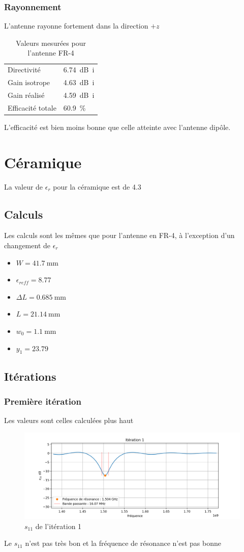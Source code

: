 \documentclass[Deriaz_Traiber_Labo02.tex]{subfiles}
\begin{document}
\subsubsection{Rayonnement}
L'antenne rayonne fortement dans la direction $+z$
\begin{table}[H]
\centering
\begin{tabular}{ll}
Directivité & \SI{6.74}{\deci\bel i}\\
Gain isotrope & \SI{4.63}{\deci\bel i}\\
Gain réalisé & \SI{4.59}{\deci\bel i}\\
Efficacité totale & \SI{60.9}{\percent}
\end{tabular}
\caption{Valeurs mesurées pour l'antenne FR-4}
\end{table}
L'efficacité est bien moins bonne que celle atteinte avec l'antenne dipôle.
\section{Céramique}
La valeur de $\epsilon_r$ pour la céramique est de 4.3
\subsection{Calculs}
Les calculs sont les mêmes que pour l'antenne en FR-4, à l'exception d'un changement de $\epsilon_r$
\begin{itemize}
\item $W=\SI{41.7}{\milli\meter}$
\item $\epsilon_{reff}=8.77$
\item $\Delta L=\SI{0.685}{\milli\meter}$
\item $L=\SI{21.14}{\milli\meter}$
\item $w_0=\SI{1.1}{\milli\meter}$
\item $y_1=23.79$
\end{itemize}
\subsection{Itérations}
\subsubsection{Première itération}
Les valeurs sont celles calculées plus haut
\begin{figure}[H]
\centering
\includegraphics[width=15cm]{../Calculs/run_id_ceramique_1.png}
\caption[caption]{$s_{11}$ de l'itération 1}
\end{figure}
Le $s_{11}$ n'est pas très bon et la fréquence de résonance n'est pas bonne
\end{document}
